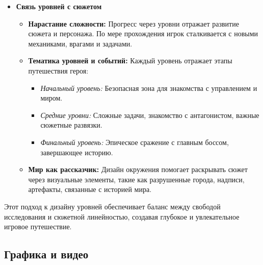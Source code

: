 \documentclass{article}
\begin{document}
\begin{itemize}
\item \textbf{Связь уровней с сюжетом}
\begin{itemize}
    \item \textbf{Нарастание сложности:} Прогресс через уровни отражает развитие сюжета и персонажа. По мере прохождения игрок сталкивается с новыми механиками, врагами и задачами.
    \item \textbf{Тематика уровней и событий:} Каждый уровень отражает этапы путешествия героя:
    \begin{itemize}
        \item \textit{Начальный уровень:} Безопасная зона для знакомства с управлением и миром.
        \item \textit{Средние уровни:} Сложные задачи, знакомство с антагонистом, важные сюжетные развязки.
        \item \textit{Финальный уровень:} Эпическое сражение с главным боссом, завершающее историю.
    \end{itemize}
    \item \textbf{Мир как рассказчик:} Дизайн окружения помогает раскрывать сюжет через визуальные элементы, такие как разрушенные города, надписи, артефакты, связанные с историей мира.
\end{itemize}
\end{itemize}
Этот подход к дизайну уровней обеспечивает баланс между свободой исследования и сюжетной линейностью, создавая глубокое и увлекательное игровое путешествие.
\subsection{Графика и видео}
\end{document}
